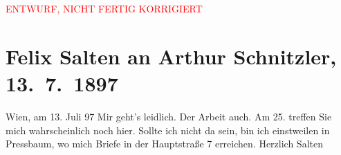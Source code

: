 
\begin{center}
            \textcolor{red}{ENTWURF, NICHT FERTIG KORRIGIERT}
                      \end{center}
            
         \renewcommand{\erwaehnteOrte}{Orte: Hauptstraße, Pressbaum, Wien}
         \renewcommand{\erwaehnteWerke}{}
               \section[Felix Salten an Arthur Schnitzler, 13. 7. 1897]{ Felix Salten an Arthur Schnitzler, 13. 7. 1897}\nopagebreak{}\rehead{ }\begin{ledgroupsized}[t]{13cm}\normalsize\beginnumbering \toendnotes[C]{\smallbreak\pagebreak[2]} 
\pstart
           \raggedleft{}{\pb}Wien, am 13. Juli 97\pend
           \pstart
           Mir geht's leidlich. Der Arbeit auch.\pend
           \pstart
           Am 25. treffen Sie mich wahrscheinlich noch hier. Sollte ich nicht da
               sein, bin ich einstweilen in Pressbaum, wo mich
               Briefe in der Hauptstraße 7 erreichen.\pend
           \pstart Herzlich \spacefill\mbox{Salten}\pend{}
         
         \endnumbering{}\end{ledgroupsized}\begin{anhang}\end{anhang}\newcommand{\dateiname}{L03268}\newcommand{\titel}{Felix Salten an Arthur Schnitzler, 13. 7. 1897}\newcommand{\editorInnen}{Martin Anton Müller und Laura Untner}
      